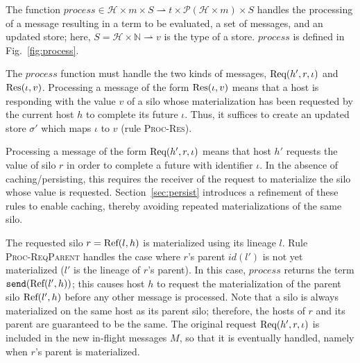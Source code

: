 \begin{defn}
  The function $process \in \mathcal{H} \times m \times S  \rightharpoonup t \times \mathcal{P}(\mathcal{H} \times m) \times S$ handles the processing of a message resulting in a term to be evaluated, a set of messages, and an updated store; here, $S = \mathcal{H} \times \mathbb{N} \rightharpoonup v$ is the type of a store. $process$ is defined in Fig.~\ref{fig:process}.
\end{defn}

The $\mathit{process}$ function must handle the two kinds of messages,
${\textrm{Req}(h', r, \iota)}$ and ${\textrm{Res}(\iota, v)}$. Processing a message of
the form ${\textrm{Res}(\iota, v)}$ means that a host is responding with the
value $v$ of a silo whose materialization has been requested by the
current host $h$ to complete its future $\iota$. Thus, it suffices to
create an updated store $\sigma'$ which maps $\iota$ to $v$ (rule
\textsc{Proc-Res}).

Processing a message of the form ${\textrm{Req}(h', r, \iota)}$ means that host
$h'$ requests the value of silo $r$ in order to complete a future with
identifier $\iota$. In the absence of caching/persisting, this
requires the receiver of the request to materialize the silo whose
value is requested. Section~\ref{sec:persist} introduces a refinement
of these rules to enable caching, thereby avoiding repeated
materializations of the same silo.



The requested silo $r = {\textrm{Ref}(l, h)}$ is materialized using its lineage
$l$. Rule \\\textsc{Proc-ReqParent} handles the case where $r$'s
parent $id(l')$ is not yet materialized ($l'$ is the lineage of $r$'s
parent). In this case, $\mathit{process}$ returns the term
$\texttt{send}({\textrm{Ref}(l', h)})$; this causes host $h$ to request the
materialization of the parent silo ${\textrm{Ref}(l', h)}$ before any other
message is processed. Note that a silo is always materialized on the
same host as its parent silo; therefore, the hosts of $r$ and its
parent are guaranteed to be the same. The original request ${\textrm{Req}(h', r, \iota)}$ is included in the new in-flight messages $M$, so that it
is eventually handled, namely when $r$'s parent is materialized.

